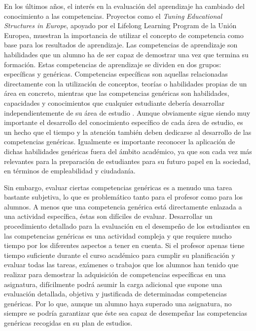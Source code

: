 
En los últimos años, el interés en la evaluación del aprendizaje ha cambiado del conocimiento a las competencias. Proyectos como el \emph{Tuning Educational Structures in Europe}, apoyado por el Lifelong Learning Program de la Unión Europea, muestran la importancia de utilizar el concepto de competencia como base para los resultados de aprendizaje. Las competencias de aprendizaje son habilidades que un alumno ha de ser capaz de demostrar una vez que termina su formación. Estas competencias de aprendizaje se dividen en dos grupos: específicas y genéricas. Competencias específicas son aquellas relacionadas directamente con la utilización de conceptos, teorías o habilidades propias de un área en concreto, mientras que las competencias genéricas son habilidades, capacidades y conocimientos que cualquier estudiante debería desarrollar independientemente de su área de estudio \cite{Tuning:2003}. Aunque obviamente sigue siendo muy importante el desarrollo del conocimiento específico de cada área de estudio, es un hecho que el tiempo y la atención también deben dedicarse al desarrollo de las competencias genéricas. Igualmente es importante reconocer la aplicación de dichas habilidades genéricas fuera del ámbito académico, ya que son cada vez más relevantes para la preparación de estudiantes para su futuro papel en la sociedad, en términos de empleabilidad y ciudadanía.

Sin embargo, evaluar ciertas competencias genéricas es a menudo una tarea bastante subjetiva, lo que es problemático tanto para el profesor como para los alumnos. A menos que una competencia genérica está directamente enlazada a una actividad específica, éstas son difíciles de evaluar. Desarrollar un procedimiento detallado para la evaluación en el desempeño de los estudiantes en las competencias genéricas es una actividad compleja y que requiere mucho tiempo por los diferentes aspectos a tener en cuenta. Si el profesor apenas tiene tiempo suficiente durante el curso académico para cumplir su planificación y evaluar todas las tareas, exámenes o trabajos que los alumnos han tenido que realizar para demostrar la adquisición de competencias específicas en una asignatura, difícilmente podrá asumir la carga adicional que supone una evaluación detallada, objetiva y justificada de determinadas competencias genéricas. Por lo que, aunque un alumno haya superado una asignatura, no siempre se podría garantizar que éste sea capaz de desempeñar las competencias genéricas recogidas en su plan de estudios.

